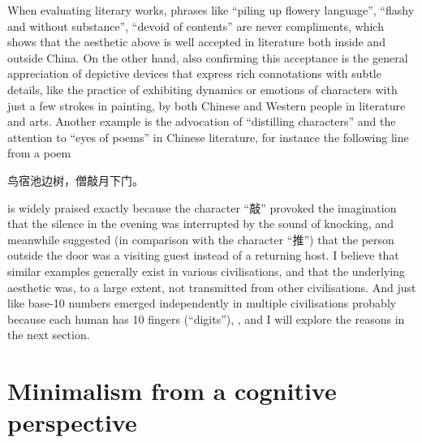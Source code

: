 When evaluating literary works, phrases like ``piling up flowery language'',
``flashy and without substance'', ``devoid of contents'' \etc{} are never
compliments, which shows that the aesthetic above is well accepted in literature
both inside and outside China.  On the other hand, also confirming this
acceptance is the general appreciation of depictive devices that express rich
connotations with subtle details, like the practice of exhibiting dynamics or
emotions of characters with just a few strokes in painting, by both Chinese
and Western people in literature and arts.  Another example is the advocation
of ``distilling characters'' and the attention to ``eyes of poems'' in
Chinese literature, for instance the following line from a poem
\begin{quoting}
	鸟宿池边树，僧敲月下门。
\end{quoting}
is widely praised exactly because the character ``敲'' provoked the
imagination that the silence in the evening was interrupted by the sound
of knocking, and meanwhile suggested (in comparison with the character
``推'') that the person outside the door was a visiting guest instead of a
returning host.  I believe that similar examples generally exist in various
civilisations, and that the underlying aesthetic was, to a large extent, not
transmitted from other civilisations.  And just like base-10 numbers emerged
independently in multiple civilisations probably because each human has 10
fingers (``digits''), ,
and I will explore the reasons in the next section.

\section{Minimalism from a cognitive perspective}\label{sec:cognitive}

